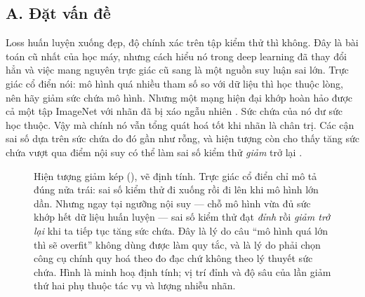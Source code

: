\documentclass[../../../deep_learning.tex]{subfiles}
\begin{document}
\subsection{A. Đặt vấn đề}
Loss huấn luyện xuống đẹp, độ chính xác trên tập kiểm thử thì không. Đây là bài toán cũ nhất của học máy, nhưng cách hiểu nó trong deep learning đã thay đổi hẳn và việc mang nguyên trực giác cũ sang là một nguồn suy luận sai lớn. Trực giác cổ điển nói: mô hình quá nhiều tham số so với dữ liệu thì học thuộc lòng, nên hãy giảm sức chứa mô hình. Nhưng một mạng hiện đại khớp hoàn hảo được cả một tập ImageNet với nhãn đã bị xáo ngẫu nhiên \cite{zhang2017rethinking}. Sức chứa của nó dư sức học thuộc. Vậy mà chính nó vẫn tổng quát hoá tốt khi nhãn là chân trị. Các cận sai số dựa trên sức chứa do đó gần như rỗng, và hiện tượng  còn cho thấy tăng sức chứa vượt qua điểm nội suy có thể làm sai số kiểm thử \emph{giảm} trở lại \cite{belkin2019double,nakkiran2020deep}.


\begin{figure}[H]\centering
{}
\caption{Hiện tượng giảm kép (), vẽ định tính. Trực giác cổ điển chỉ mô tả đúng nửa trái: sai số kiểm thử đi xuống rồi đi lên khi mô hình lớn dần. Nhưng ngay tại ngưỡng nội suy --- chỗ mô hình vừa đủ sức khớp hết dữ liệu huấn luyện --- sai số kiểm thử đạt \emph{đỉnh} rồi \emph{giảm trở lại} khi ta tiếp tục tăng sức chứa. Đây là lý do câu ``mô hình quá lớn thì sẽ overfit'' không dùng được làm quy tắc, và là lý do phải chọn công cụ chính quy hoá theo đo đạc chứ không theo lý thuyết sức chứa. Hình là minh hoạ định tính; vị trí đỉnh và độ sâu của lần giảm thứ hai phụ thuộc tác vụ và lượng nhiễu nhãn.}
\label{fig:double-descent}
\end{figure}
\end{document}
